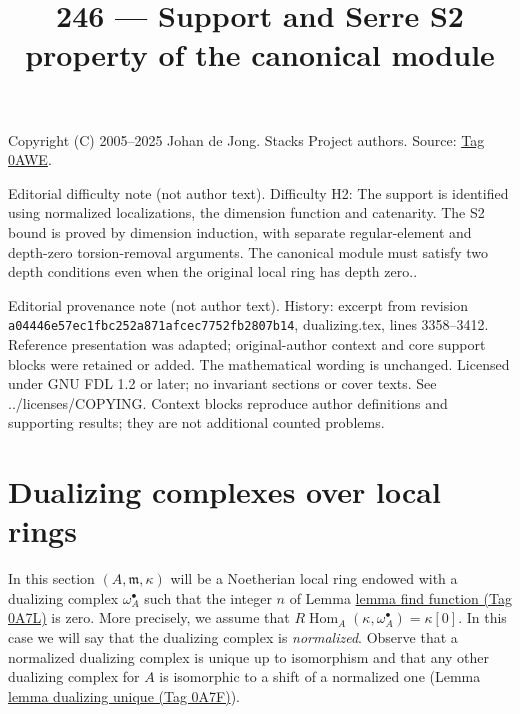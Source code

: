 \documentclass{amsart}
\theoremstyle{plain}
\theoremstyle{definition}
\theoremstyle{remark}
\numberwithin{equation}{subsection}
\def\Hom{\mathop{\mathrm{Hom}}\nolimits}
\begin{document}
\title[Stacks Project, Tag 0AWE]{246 --- Support and Serre S2 property of the canonical module}
\maketitle
\noindent Copyright (C) 2005--2025 Johan de Jong. Stacks Project authors. Source: \href{https://stacks.math.columbia.edu/tag/0AWE}{Tag 0AWE}.

\noindent Editorial difficulty note (not author text). Difficulty H2: The support is identified using normalized localizations, the dimension function and catenarity. The S2 bound is proved by dimension induction, with separate regular-element and depth-zero torsion-removal arguments. The canonical module must satisfy two depth conditions even when the original local ring has depth zero..

\noindent Editorial provenance note (not author text). History: excerpt from revision \texttt{a0444\allowbreak 6e57e\allowbreak c1fbc\allowbreak 252a8\allowbreak 71afc\allowbreak ec775\allowbreak 2fb28\allowbreak 07b14}, dualizing.tex, lines 3358--3412. Reference presentation was adapted; original-author context and core support blocks were retained or added. The mathematical wording is unchanged. Licensed under GNU FDL 1.2 or later; no invariant sections or cover texts. See ../licenses/COPYING. Context blocks reproduce author definitions and supporting results; they are not additional counted problems.

\section{Dualizing complexes over local rings}
\label{section-dualizing-local}

\noindent
In this section $(A, \mathfrak m, \kappa)$ will be a Noetherian local
ring endowed with a dualizing complex $\omega_A^\bullet$ such that
the integer $n$ of Lemma \href{https://stacks.math.columbia.edu/tag/0A7L}{lemma find function (Tag 0A7L)} is zero.
More precisely, we assume that $R\Hom_A(\kappa, \omega_A^\bullet) = \kappa[0]$.
In this case we will say that the dualizing complex is {\it normalized}.
Observe that a normalized dualizing complex is unique up to
isomorphism and that any other dualizing complex for $A$ is isomorphic
to a shift of a normalized one (Lemma \href{https://stacks.math.columbia.edu/tag/0A7F}{lemma dualizing unique (Tag 0A7F)}).
\end{document}
